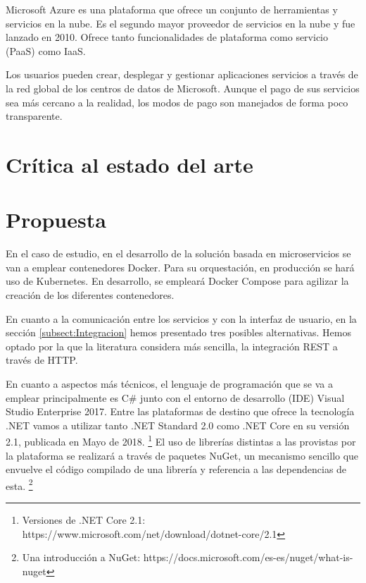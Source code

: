 \documentclass[11pt,spanish,listoffigures]{tfgetsinf}
\begin{document}
Microsoft Azure es una plataforma que ofrece un conjunto de herramientas y servicios en la nube. Es el segundo mayor proveedor de servicios en la nube y fue lanzado en 2010. Ofrece tanto funcionalidades de plataforma como servicio (PaaS) como IaaS.

Los usuarios pueden crear, desplegar y gestionar aplicaciones  servicios a través de la red global de los centros de datos de Microsoft. Aunque el pago de sus servicios sea más cercano a la realidad, los modos de pago son manejados de forma poco transparente. \cite{Qaisi2016}

\section{Crítica al estado del arte}

\section{Propuesta} \label{sect:Propuesta}

En el caso de estudio, en el desarrollo de la solución basada en microservicios se van a emplear contenedores Docker. Para su orquestación, en producción se hará uso de Kubernetes. En desarrollo, se empleará Docker Compose para agilizar la creación de los diferentes contenedores. 

En cuanto a la comunicación entre los servicios y con la interfaz de usuario, en la sección \ref{subsect:Integracion}  hemos presentado tres posibles alternativas. Hemos optado por la que la literatura considera más sencilla, la integración REST a través de HTTP.

En cuanto a aspectos más técnicos, el lenguaje de programación que se va a emplear principalmente es C\# junto con el entorno de desarrollo (IDE) Visual Studio Enterprise 2017. Entre las plataformas de destino que ofrece la tecnología .NET vamos a utilizar tanto .NET Standard 2.0 como .NET Core en su versión 2.1, publicada en Mayo de 2018. \footnote{ Versiones de .NET Core 2.1: https://www.microsoft.com/net/download/dotnet-core/2.1} El uso de librerías distintas a las provistas por la plataforma se realizará a través de paquetes NuGet, un mecanismo sencillo que envuelve el código compilado de una librería y referencia a las dependencias de esta. \footnote{ Una introducción a NuGet: https://docs.microsoft.com/es-es/nuget/what-is-nuget}
\end{document}
